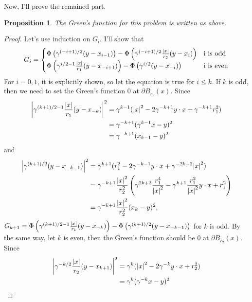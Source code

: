 \documentclass{article}
\newtheorem{proposition}{Proposition}
\begin{document}
Now, I'll prove the remained part.
\begin{proposition}
The Green's function for this problem is written as above.
\end{proposition}
\begin{proof}
Let's use induction on $G_i$. I'll show that
\begin{equation*}
G_i=
\begin{cases}
\Phi\left(\gamma^{(-i+1)/2}(y-x_{i-1})\right)-\Phi\left(\gamma^{(-i+1)/2}\frac{|x|}{r_2}(y-x_i)\right) & \text{i is odd} \\
\Phi\left(\gamma^{i/2-1}\frac{\abs{x}}{r_1}(y-x_{-i+1})\right)-\Phi\left(\gamma^{i/2}(y-x_{-i})\right) & \text{i is even}
\end{cases}
\end{equation*}
For $i=0,1$, it is explicitly shown, so let the equation is true for $i\leq k$. If $k$ is odd, then we need to set the Green's function $0$ at $\partial B_{r_1}(x)$. Since
\begin{equation*}
\begin{split}
\abs{\gamma^{(k+1)/2-1}\frac{\abs{x}}{r_1}(y-x_{-k})}^2&=\gamma^{k-1}(\abs{x}^2-2\gamma^{-k+1} y\cdot x+\gamma^{-k+1}r_1^2) \\
&=\gamma^{-k+1}(\gamma^{k-1}x-y)^2 \\
&=\gamma^{-k+1}(x_{k-1}-y)^2
\end{split}
\end{equation*}
and
\begin{equation*}
\begin{split}
\abs{\gamma^{(k+1)/2}(y-x_{-k-1})}^2&=\gamma^{k+1}(r_1^2-2\gamma^{-k-1}y\cdot x + \gamma^{-2k-2}\abs{x}^2) \\
&=\gamma^{-k+1}\frac{\abs{x}^2}{r_2^2}\left(\gamma^{2k+2}\frac{r_1^4}{\abs{x}^2}-\gamma^{k+1}\frac{r_1^2}{\abs{x}^2}y\cdot x+r_1^2\right)\\
&=\gamma^{-k+1}\frac{\abs{x}^2}{r_2^2}(x_k-y)^2,
\end{split}
\end{equation*}
$G_{k+1}=\Phi\left(\gamma^{(k+1)/2-1}\frac{\abs{x}}{r_1}(y-x_{-k})\right)-\Phi\left(\gamma^{(k+1)/2}(y-x_{-k-1})\right)$ for $k$ is odd. By the same way, let $k$ is even, then the Green's function should be $0$ at $\partial B_{r_2}(x)$. Since
\begin{equation*}
\begin{split}
\abs{\gamma^{-k/2}\frac{\abs{x}}{r_2}(y-x_{k+1})}^2&=\gamma^{k}(\abs{x}^2-2\gamma^{-k} y\cdot x+r_2^2) \\
&=\gamma^{k}(\gamma^{-k}x-y)^2 \\

\end{split}
\end{equation*}
\end{proof}
\end{document}
